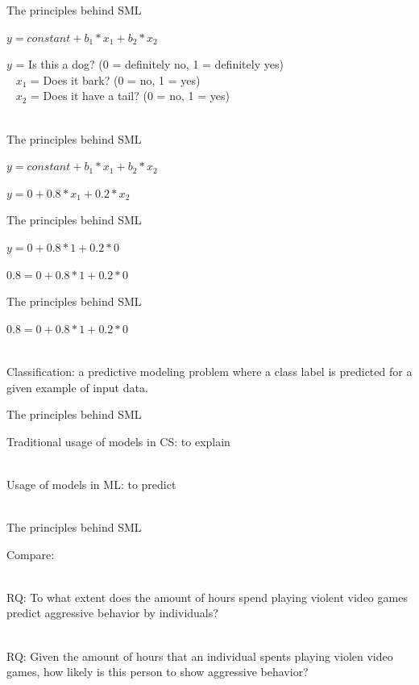 \documentclass[compress]{beamer}
\begin{document}
\begin{frame}[fragile]{The principles behind SML} 
	
\(y = constant + b_1 * x_1 + b_2 * x_2\) 

\pause

\(y\) = Is this a dog? (0 = definitely no, 1 = definitely yes) \\\
\pause
\(x_1\) = Does it bark? (0 = no, 1 = yes) \\\
\pause
\(x_2\) = Does it have a tail? (0 = no, 1 = yes) \\\
	
\end{frame}

\begin{frame}[fragile]{The principles behind SML} 
	
\(y = constant + b_1 * x_1 + b_2 * x_2\)
\pause
	
\(y = 0 + 0.8 * x_1 + 0.2 * x_2\) 
\end{frame}


\begin{frame}[fragile]{The principles behind SML} 
	
\(y = 0 + 0.8 * 1 + 0.2 * 0\)
\pause
	
\(0.8 = 0 + 0.8 * 1 + 0.2 * 0\)
\end{frame}


\begin{frame}{The principles behind SML} 
	
\(0.8 = 0 + 0.8 * 1 + 0.2 * 0\)\\\

\pause
	
Classification: a predictive modeling problem where a class label is predicted for a given example of input data. 
\end{frame}


\begin{frame}[fragile]{The principles behind SML} 
	
Traditional usage of models in CS: to explain \\\
\pause

Usage of models in ML: to predict \\\
\end{frame}

\begin{frame}{The principles behind SML} 
	
Compare: \\\
	
RQ: To what extent does the amount of hours spend playing violent video games predict aggressive behavior by individuals? \\\
	
RQ: Given the amount of hours that an individual spents playing violen video games, how likely is this person to show aggressive behavior?
	
\end{frame}
\end{document}
